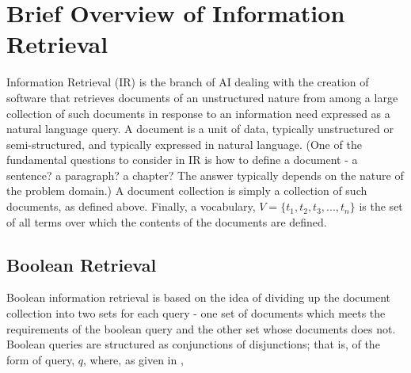  
\appendix    %

\chapter{Brief Overview of Information Retrieval}
\label{app:information_retrieval}

Information Retrieval (IR) \cite{manning_2008_introduction_ch1} is the branch of AI dealing with the creation of software that retrieves documents of an unstructured nature from among a large collection of such documents in response to an information need expressed as a natural language query.   A document is a unit of data, typically unstructured or semi-structured, and typically expressed in natural language.  (One of the fundamental questions to consider in IR is how to define a document - a sentence? a paragraph? a chapter?  The answer typically depends on the nature of the problem domain.)  A document collection is simply a collection of such documents, as defined above.  Finally, a vocabulary, $V=\{t_1,t_2,t_3,...,t_n\}$ is the set of all terms over which the contents of the documents are defined.

\section{Boolean Retrieval}

Boolean information \cite{manning_2008_introduction_ch1} retrieval is based on the idea of dividing up the document collection into two sets for each query - one set of documents which meets the requirements of the boolean query and the other set whose documents does not.  Boolean queries are structured as conjunctions of disjunctions; that is, of the form of query, $q$, where, as given in \cite{wiki:boolean_retrieval},


